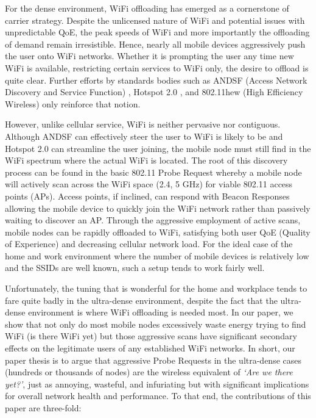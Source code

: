 \documentclass[conference]{IEEEtran}
\begin{document}
For the dense environment, WiFi offloading has emerged as a cornerstone of carrier strategy.  Despite the unlicensed nature of WiFi and potential issues with unpredictable QoE, the peak speeds of WiFi and more importantly the offloading of demand remain irresistible.  Hence, nearly all mobile devices aggressively push the user onto WiFi networks.  Whether it is prompting the user any time new WiFi is available, restricting certain services to WiFi only, the desire to offload is quite clear.  Further efforts by standards bodies such as ANDSF (Access Network Discovery and Service Function) \cite{ANDSF}, Hotspot 2.0 \cite{HS20}, and 802.11hew (High Efficiency Wireless) only reinforce that notion.

However, unlike cellular service, WiFi is neither pervasive nor contiguous.  Although ANDSF can effectively steer the user to WiFi is likely to be and Hotspot 2.0 can streamline the user joining, the mobile node must still find in the WiFi spectrum where the actual WiFi is located.  The root of this discovery process can be found in the basic 802.11 Probe Request whereby a mobile node will actively scan across the WiFi space (2.4, 5 GHz) for viable 802.11 access points (APs).  Access points, if inclined, can respond with Beacon Responses allowing the mobile device to quickly join the WiFi network rather than passively waiting to discover an AP.  Through the aggressive employment of active scans, mobile nodes can be rapidly offloaded to WiFi, satisfying both user QoE (Quality of Experience) and decreasing cellular network load.  For the ideal case of the home and work environment where the number of mobile devices is relatively low and the SSIDs are well known, such a setup tends to work fairly well.

Unfortunately, the tuning that is wonderful for the home and workplace tends to fare quite badly in the ultra-dense environment, despite the fact that the ultra-dense environment is where WiFi offloading is needed most.  In our paper, we show that not only do most mobile nodes excessively waste energy trying to find WiFi (is there WiFi yet) but those aggressive scans have significant secondary effects on the legitimate users of any established WiFi networks.  In short, our paper thesis is to argue that aggressive Probe Requests in the ultra-dense cases (hundreds or thousands of nodes) are the wireless equivalent of \emph{`Are we there yet?'}, just as annoying, wasteful, and infuriating but with significant implications for overall network health and performance.  To that end, the contributions of this paper are three-fold:
\end{document}

